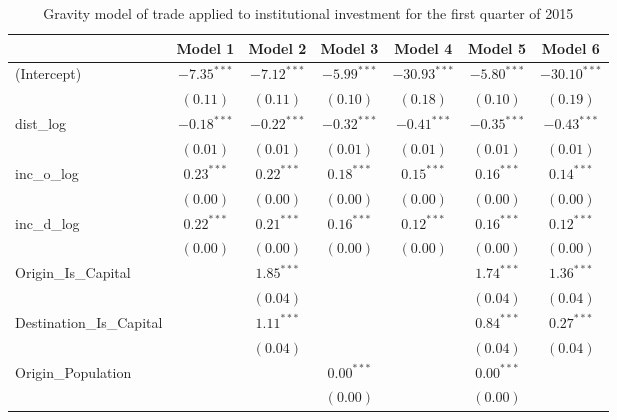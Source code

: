 \begin{table}
	\begin{center}
		\small
		\caption[CGravity Model of Trade for Q1 2015]{Gravity model of trade applied to institutional investment for the first quarter of 2015}
		\begin{tabular}{l c c c c c c }
			\hline
			& Model 1 & Model 2 & Model 3 & Model 4 & Model 5 & Model 6 \\
			\hline
			(Intercept)                  & $-7.35^{***}$ & $-7.12^{***}$ & $-5.99^{***}$ & $-30.93^{***}$ & $-5.80^{***}$ & $-30.10^{***}$ \\
			& $(0.11)$      & $(0.11)$      & $(0.10)$      & $(0.18)$       & $(0.10)$      & $(0.19)$       \\
			dist\_log                    & $-0.18^{***}$ & $-0.22^{***}$ & $-0.32^{***}$ & $-0.41^{***}$  & $-0.35^{***}$ & $-0.43^{***}$  \\
			& $(0.01)$      & $(0.01)$      & $(0.01)$      & $(0.01)$       & $(0.01)$      & $(0.01)$       \\
			inc\_o\_log                  & $0.23^{***}$  & $0.22^{***}$  & $0.18^{***}$  & $0.15^{***}$   & $0.16^{***}$  & $0.14^{***}$   \\
			& $(0.00)$      & $(0.00)$      & $(0.00)$      & $(0.00)$       & $(0.00)$      & $(0.00)$       \\
			inc\_d\_log                  & $0.22^{***}$  & $0.21^{***}$  & $0.16^{***}$  & $0.12^{***}$   & $0.16^{***}$  & $0.12^{***}$   \\
			& $(0.00)$      & $(0.00)$      & $(0.00)$      & $(0.00)$       & $(0.00)$      & $(0.00)$       \\
			Origin\_Is\_Capital          &               & $1.85^{***}$  &               &                & $1.74^{***}$  & $1.36^{***}$   \\
			&               & $(0.04)$      &               &                & $(0.04)$      & $(0.04)$       \\
			Destination\_Is\_Capital     &               & $1.11^{***}$  &               &                & $0.84^{***}$  & $0.27^{***}$   \\
			&               & $(0.04)$      &               &                & $(0.04)$      & $(0.04)$       \\
			Origin\_Population           &               &               & $0.00^{***}$  &                & $0.00^{***}$  &                \\
			&               &               & $(0.00)$      &                & $(0.00)$      &                \\

\end{tabular}
\end{center}
\end{table}
